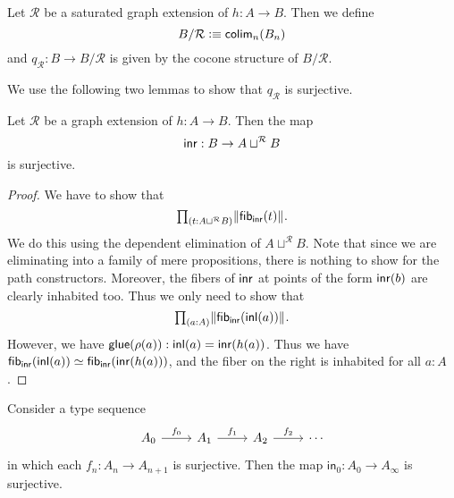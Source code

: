 \begin{defn}
Let $\mathcal{R}$ be a saturated graph extension of $h:A\to B$. Then we define
\begin{equation*}
B/\mathcal{R}\vcentcolon\equiv \mathsf{colim}_n(B_n)
\end{equation*}
and $q_\mathcal{R}:B\to B/\mathcal{R}$ is given by the cocone structure of $B/\mathcal{R}$.
\end{defn}

We use the following two lemmas to show that $q_{\mathcal{R}}$ is surjective.

\begin{lem}
Let $\mathcal{R}$ be a graph extension of $h:A\to B$. Then the map
\begin{equation*}
{\mathsf{inr}} : B\to A\sqcup^{\mathcal{R}} B
\end{equation*}
is surjective.
\end{lem}

\begin{proof}
We have to show that 
\begin{equation*}
\prd{t:A\sqcup^{\mathcal{R}} B} \brck{\fib{\inr}{t}}.
\end{equation*}
We do this using the dependent elimination of $A\sqcup^{\mathcal{R}} B$.
Note that since we are eliminating into a family of mere propositions, there is nothing to show for the path constructors.
Moreover, the fibers of ${\mathsf{inr}}$ at points of the form ${\mathsf{inr}}(b)$ are clearly inhabited too.
Thus we only need to show that
\begin{equation*}
\prd{a:A}\brck{\fib{\inr}{\inl(a)}}.
\end{equation*}
However, we have $\mathsf{glue}(\rho(a)):{\mathsf{inl}}(a)={\mathsf{inr}}(h(a))$. Thus we have $\mathsf{fib}_{{\mathsf{inr}}}({\mathsf{inl}}(a))\simeq \mathsf{fib}_{{\mathsf{inr}}}({\mathsf{inr}}(h(a)))$, and the fiber on the right is inhabited for all $a:A$.
\end{proof}

\begin{lem}
Consider a type sequence
\begin{equation*}
\begin{tikzcd}
A_0 \arrow[r,"f_0"] & A_1 \arrow[r,"f_1"] & A_2 \arrow[r,"f_2"] & \cdots
\end{tikzcd}
\end{equation*}
in which each $f_n:A_n\to A_{n+1}$ is surjective. Then the map $\mathsf{in}_0:A_0\to A_\infty$ is surjective.
\end{lem}

